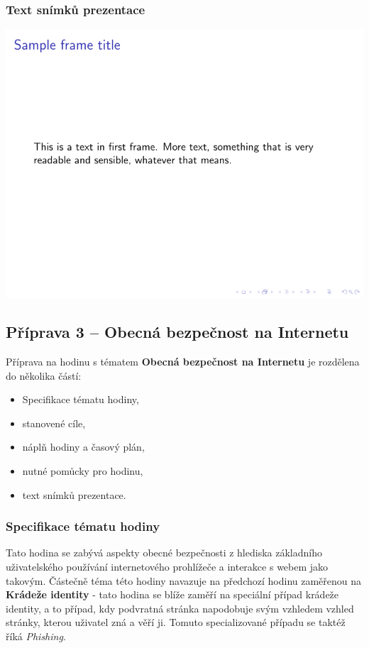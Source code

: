 \documentclass[a4paper, 12pt]{article}
\begin{document}
\subsubsection{Text snímků prezentace}
\includegraphics{IdentityTheftSlides/xdusek21-IdentityTheft.pdf}


\subsection{Příprava 3 -- Obecná bezpečnost na Internetu}
Příprava na hodinu s tématem \textbf{Obecná bezpečnost na Internetu} je rozdělena do několika částí:
\begin{itemize}
        \setlength{\itemsep}{-3pt}
        \item Specifikace tématu hodiny,
        \item stanovené cíle,
        \item náplň hodiny a časový plán,
        \item nutné pomůcky pro hodinu,
        \item text snímků prezentace.
\end{itemize}

\subsubsection{Specifikace tématu hodiny}
Tato hodina se zabývá aspekty obecné bezpečnosti z hlediska základního uživatelského používání internetového prohlížeče a interakce s webem jako takovým. Částečně téma této hodiny navazuje na předchozí hodinu zaměřenou na \textbf{Krádeže identity} - tato hodina se blíže zaměří na speciální případ krádeže identity, a to případ, kdy podvratná stránka napodobuje svým vzhledem vzhled stránky, kterou uživatel zná a věří ji. Tomuto specializované případu se taktéž říká \textit{Phishing}.
\end{document}
